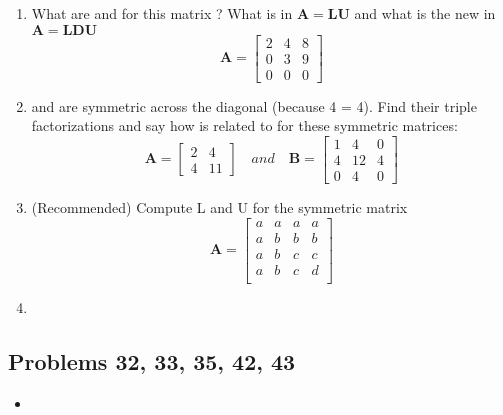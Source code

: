 \begin{itemize}
\begin{enumerate}
      \item What are  and  for this matrix ? What is  in
        \(\bm{A} = \bm{LU}\) and what is the new  in \( \bm{A} = \bm{LDU} \)
        \[%
        \bm{A} = \begin{bmatrix}
        2 & 4 & 8 \\
        0 & 3 & 9 \\
        0 & 0 & 0
        \end{bmatrix}
        \]%

      \item {} and  are symmetric across the diagonal (because 4 =
        4). Find their triple factorizations  and say how  is
        related to  for these symmetric matrices:
        \[%
        \bm{A} = \begin{bmatrix}
        2 & 4 \\
        4 & 11
        \end{bmatrix} \quad and \quad
        \bm{B} =
        \begin{bmatrix}
        1 & 4 & 0 \\
        4 & 12 & 4 \\
        0 & 4 & 0
        \end{bmatrix}
        \]%

      \item (Recommended) Compute L and U for the symmetric matrix
        \[%
        \bm{A} = \begin{bmatrix}
          a & a & a & a \\
          a & b & b & b \\
          a & b & c & c \\
          a & b & c & d \\
        \end{bmatrix}
        \]%

      \item

    \end{enumerate}

    \subsection{Problems 32, 33, 35, 42, 43}
    \begin{itemize}
      \item
    \end{itemize}

\end{itemize}

